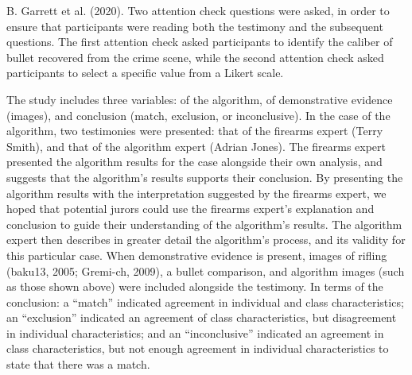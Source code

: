 \documentclass[print]{nuthesis}
\begin{document}
 B. Garrett et al. (2020).
Two attention check questions were asked, in order to ensure that participants were reading both the testimony and the subsequent questions.
The first attention check asked participants to identify the caliber of bullet recovered from the crime scene, while the second attention check asked participants to select a specific value from a Likert scale.

The study includes three  variables:  of the algorithm,  of demonstrative evidence (images), and conclusion (match, exclusion, or inconclusive).
In the case of the algorithm, two testimonies were presented: that of the firearms expert (Terry Smith), and that of the algorithm expert (Adrian Jones).
The firearms expert presented the algorithm results for the case alongside their own analysis, and suggests that the algorithm's results supports their conclusion.
By presenting the algorithm results with the interpretation suggested by the firearms expert, we hoped that potential jurors could use the firearms expert's explanation and conclusion to guide their understanding of the algorithm's results.
The algorithm expert then describes in greater detail the algorithm's process, and its validity for this particular case.
When demonstrative evidence is present, images of rifling (baku13, 2005; Gremi-ch, 2009), a bullet comparison, and algorithm images (such as those shown above) were included alongside the testimony.
In terms of the conclusion: a ``match'' indicated agreement in individual and class characteristics; an ``exclusion'' indicated an agreement of class characteristics, but disagreement in individual characteristics; and an ``inconclusive'' indicated an agreement in class characteristics, but not enough agreement in individual characteristics to state that there was a match.
\end{document}
